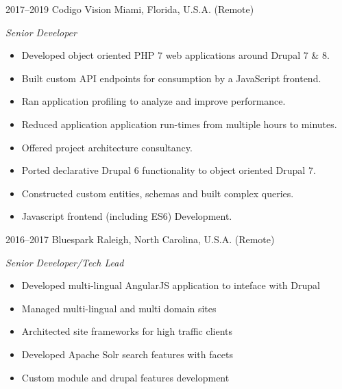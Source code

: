 \documentclass[]{friggeri-cv} %
\begin{document}
\begin{entrylist}

\entry
{2017--2019}
{Codigo Vision}
{Miami, Florida, U.S.A. (Remote)}
{\emph{Senior Developer}
\begin{itemize}
\item Developed object oriented PHP 7 web applications around Drupal 7 \& 8.
\item Built custom API endpoints for consumption by a JavaScript frontend.
\item Ran application profiling to analyze and improve performance.
\item Reduced application application run-times from multiple hours to minutes.
\item Offered project architecture consultancy.
\item Ported declarative Drupal 6 functionality to object oriented Drupal 7.
\item Constructed custom entities, schemas and built complex queries.
\item Javascript frontend (including ES6) Development.
\end{itemize}}

\entry
{2016--2017}
{Bluespark}
{Raleigh, North Carolina, U.S.A. (Remote)}
{\emph{Senior Developer/Tech Lead}
\begin{itemize}
\item Developed multi-lingual AngularJS application to inteface with Drupal
\item Managed multi-lingual and multi domain sites
\item Architected site frameworks for high traffic clients
\item Developed Apache Solr search features with facets
\item Custom module and drupal features development
\end{itemize}}


\end{entrylist}
\end{document}
